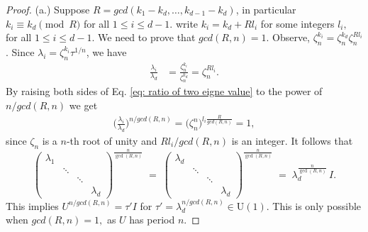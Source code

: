 \documentclass[a4paper,onecolumn,accepted=2026-04-08,10pt]{quantumarticle}
\theoremstyle{definition}
\begin{document}
\begin{proof}\label{proof:lemma 1}
     (a.) Suppose $R = gcd(k_1 - k_d, \ldots, k_{d-1} - k_d)$, in particular $k_i \equiv k_d \pmod{R}$ for all $1 \leq i \leq d-1.$  write $k_i = k_{d} + Rl_{i}$ for some integers $l_i,$ for all $1 \leq i \leq d-1.$ We need to prove that $gcd(R,n) =1.$
     Observe,
     $\zeta_{n}^{k_i} = \zeta_{n}^{k_d} \zeta_{n}^{Rl_i} $. Since $\lambda_{i} = \zeta_{n}^{k_i} \tau^{1/n}$, we have 
     \begin{align}\label{eq: ratio of two eigne value}
         \frac{\lambda_i}{\lambda_d} &= \frac{\zeta_{n}^{k_i}}{ \zeta_{n}^{k_d}} = \zeta_{n}^{Rl_i}.
     \end{align}
     By raising both sides of Eq. \ref{eq: ratio of two eigne value} to the power of $n/gcd(R,n)$ we get
     \begin{align}
          \bigg(\frac{\lambda_i}{\lambda_d}\bigg)^{n/gcd(R,n)} = \bigg(\zeta_{n}^n\bigg)^{l_i\frac{R}{gcd(R,n)}} = 1,
     \end{align}
    since $\zeta_{n}$ is a $n$-th root of unity and  $Rl_i/gcd(R,n)$ is an integer. It follows that
\begin{equation}\label{eq:diag-power}
\begin{pmatrix}
\lambda_{1} &        &        &        \\
            & \ddots &        &        \\
            &        & \ddots &        \\
            &        &        & \lambda_{d}
\end{pmatrix}^{\tfrac{n}{\gcd(R,n)}}
\;=\;
\begin{pmatrix}
\lambda_{d} &        &        &        \\
            & \ddots &        &        \\
            &        & \ddots &        \\
            &        &        & \lambda_{d}
\end{pmatrix}^{\tfrac{n}{\gcd(R,n)}}
\;=\;
\lambda_{d}^{\tfrac{n}{\gcd(R,n)}}\,I.
\end{equation}
This implies $U^{n/gcd(R,n)} = \tau' I $ for $\tau' = \lambda_d^{n/gcd(R,n)} \in \mathrm{U}(1)$. This is only possible when $gcd(R,n) = 1,$ as $U$ has period $n$.


\end{proof}
\end{document}
